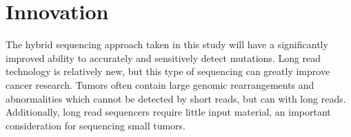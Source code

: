 
% 






\section{Innovation}

The hybrid sequencing approach taken in this study will have a significantly improved ability to accurately and sensitively detect mutations. Long read technology is relatively new, but this type of sequencing can greatly improve cancer research. Tumors often contain large genomic rearrangements and abnormalities which cannot be detected by short reads, but can with long reads. Additionally, long read sequencers require little input material, an important consideration for sequencing small tumors.

